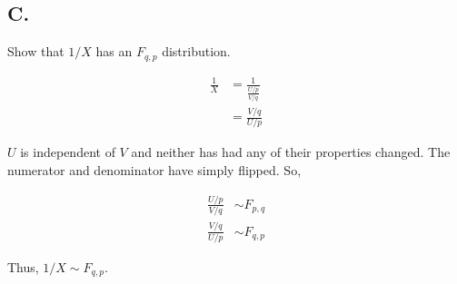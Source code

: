 \subsection*{C.}

Show that $1/X$ has an $F_{q,p}$ distribution.

\begin{align*}
	\frac{1}{X} &= \frac{1}{\frac{U/p}{V/q}} \\
	&= \frac{V/q}{U/p}
\end{align*}

$U$ is independent of $V$ and neither has had any of their properties changed. The numerator and denominator have simply flipped. So,

\begin{align*}
	\frac{U/p}{V/q} &\sim F_{p,q} \\
	\frac{V/q}{U/p} &\sim F_{q,p}
\end{align*}

Thus, $1/X \sim F_{q,p}$.
